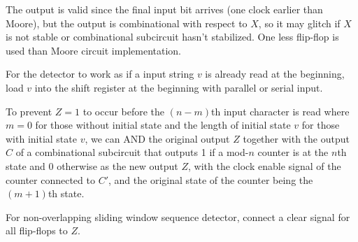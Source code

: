 \documentclass[a4paper,12pt]{report}
\begin{document}
The output is valid since the final input bit arrives (one clock earlier than Moore), but the output is combinational with respect to $X$, so it may glitch if $X$ is not stable or combinational subcircuit hasn't stabilized. One less flip-flop is used than Moore circuit implementation.
\eit

For the detector to work as if a input string $v$ is already read at the beginning, load $v$ into the shift register at the beginning with parallel or serial input.

To prevent $Z=1$ to occur before the $(n-m)$th input character is read where $m=0$ for those without initial state and the length of initial state $v$ for those with initial state $v$, we can AND the original output $Z$ together with the output $C$ of a combinational subcircuit that outputs 1 if a mod-$n$ counter is at the $n$th state and 0 otherwise as the new output $Z$, with the clock enable signal of the counter connected to $C'$, and the original state of the counter being the $(m+1)$th state.

For non-overlapping sliding window sequence detector, connect a clear signal for all flip-flops to $Z$.
\end{document}
